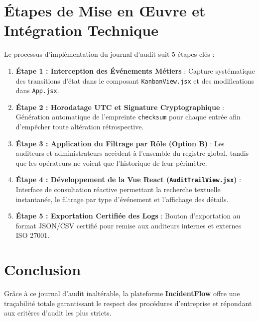 \documentclass[11pt,a4paper]{article}
\begin{document}
\section{Étapes de Mise en Œuvre et Intégration Technique}

Le processus d'implémentation du journal d'audit suit 5 étapes clés :

\begin{enumerate}
    \item \textbf{Étape 1 : Interception des Événements Métiers} : Capture systématique des transitions d'état dans le composant \texttt{KanbanView.jsx} et des modifications dans \texttt{App.jsx}.
    \item \textbf{Étape 2 : Horodatage UTC et Signature Cryptographique} : Génération automatique de l'empreinte \texttt{checksum} pour chaque entrée afin d'empêcher toute altération rétrospective.
    \item \textbf{Étape 3 : Application du Filtrage par Rôle (Option B)} : Les auditeurs et administrateurs accèdent à l'ensemble du registre global, tandis que les opérateurs ne voient que l'historique de leur périmètre.
    \item \textbf{Étape 4 : Développement de la Vue React (\texttt{AuditTrailView.jsx})} : Interface de consultation réactive permettant la recherche textuelle instantanée, le filtrage par type d'événement et l'affichage des détails.
    \item \textbf{Étape 5 : Exportation Certifiée des Logs} : Bouton d'exportation au format JSON/CSV certifié pour remise aux auditeurs internes et externes ISO 27001.
\end{enumerate}

\section{Conclusion}

Grâce à ce journal d'audit inaltérable, la plateforme \textbf{IncidentFlow} offre une traçabilité totale garantissant le respect des procédures d'entreprise et répondant aux critères d'audit les plus stricts.
\end{document}
